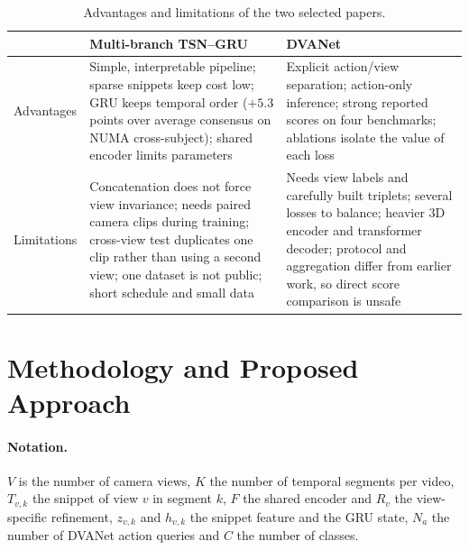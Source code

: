 \documentclass[runningheads]{llncs}
\begin{document}
\begin{table}[tb]
\caption{Advantages and limitations of the two selected papers.}\label{tab:advlim}
\centering\small
\begin{tabular}{@{}p{1.9cm}p{4.9cm}p{4.9cm}@{}}
\toprule
 & Multi-branch TSN--GRU~\cite{bui} & DVANet~\cite{dva}\\\midrule
Advantages & Simple, interpretable pipeline; sparse snippets keep cost low; GRU keeps temporal order ($+5.3$ points over average consensus on NUMA cross-subject); shared encoder limits parameters & Explicit action/view separation; action-only inference; strong reported scores on four benchmarks; ablations isolate the value of each loss\\\addlinespace
Limitations & Concatenation does not force view invariance; needs paired camera clips during training; cross-view test duplicates one clip rather than using a second view; one dataset is not public; short schedule and small data & Needs view labels and carefully built triplets; several losses to balance; heavier 3D encoder and transformer decoder; protocol and aggregation differ from earlier work, so direct score comparison is unsafe\\\bottomrule
\end{tabular}
\end{table}

\section{Methodology and Proposed Approach}\label{sec:method}
\paragraph{Notation.} $V$ is the number of camera views, $K$ the number of temporal segments per video, $T_{v,k}$ the snippet of view $v$ in segment $k$, $F$ the shared encoder and $R_v$ the view-specific refinement, $z_{v,k}$ and $h_{v,k}$ the snippet feature and the GRU state, $N_a$ the number of DVANet action queries and $C$ the number of classes.
\end{document}
